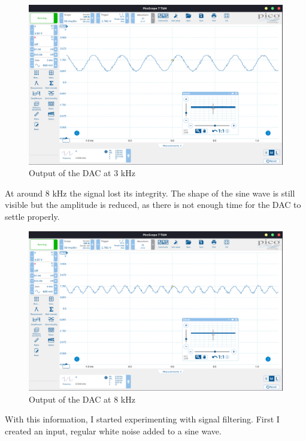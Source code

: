\begin{figure}[H]
    \centering
    \includegraphics[width=150mm, keepaspectratio]{figures/upperlimit-good.png}
    \caption{Output of the DAC at 3 kHz}
    \label{fig:upperlimit-good}
\end{figure}

At around 8 kHz the signal lost its integrity. The shape of the sine wave is still visible but the amplitude is reduced, as there is not enough time for the DAC to settle properly.

\begin{figure}[H]
    \centering
    \includegraphics[width=150mm, keepaspectratio]{figures/upperlimit-bad.png}
    \caption{Output of the DAC at 8 kHz}
    \label{fig:upperlimit-bad}
\end{figure}

With this information, I started experimenting with signal filtering. First I created an input, regular white noise added to a sine wave.

